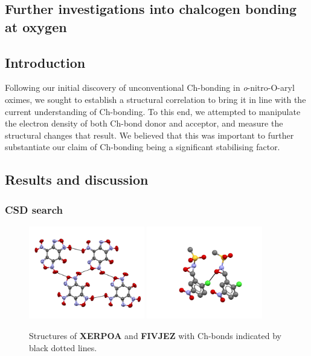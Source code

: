 \begin{refsection}
\chapter{Further investigations into chalcogen bonding at oxygen}\label{ch:o-ch-bonding-further}

\section{Introduction}
Following our initial discovery of unconventional Ch-bonding in \emph{o}-nitro-O-aryl oximes, we sought to establish a structural correlation to bring it in line with the current understanding of Ch-bonding.
To this end, we attempted to manipulate the electron density of both Ch-bond donor and acceptor, and measure the structural changes that result.
We believed that this was important to further substantiate our claim of Ch-bonding being a significant stabilising factor.

\section{Results and discussion}

\subsection{CSD search}

\begin{figure}
    \centering
    \includegraphics[width=0.45\textwidth]{Figures/XERPOA.pdf}
    \includegraphics[width=0.45\textwidth]{Figures/FIVJEZ.pdf}
    \caption[Structures of \textbf{XERPOA} and \textbf{FIVJEZ}.]{Structures of \textbf{XERPOA} and \textbf{FIVJEZ} with Ch-bonds indicated by black dotted lines.}\label{fig:furoxan-oxaziridine}
\end{figure}


\end{refsection}
